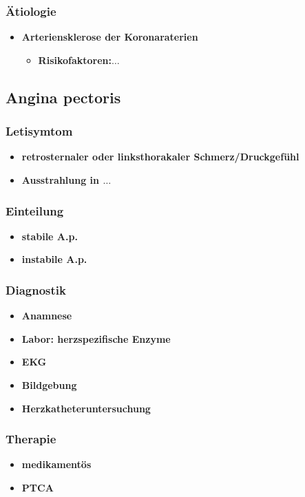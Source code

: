 		\subsubsection*{Ätiologie}
			\begin{itemize}
				\item \textbf{Arteriensklerose der Koronaraterien}
					\begin{itemize}
						\item \textbf{Risikofaktoren:$\dots$}
					\end{itemize}
			\end{itemize}
	\subsection*{Angina pectoris}
		\subsubsection*{Letisymtom}
			\begin{itemize}
				\item \textbf{retrosternaler oder linksthorakaler Schmerz/Druckgefühl}
				\item \textbf{Ausstrahlung in $\dots$}
			\end{itemize}
		\subsubsection*{Einteilung}
			\begin{itemize}
				\item \textbf{stabile A.p.}
				\item \textbf{instabile A.p.}
			\end{itemize}
		\subsubsection*{Diagnostik}
			\begin{itemize}
				\item \textbf{Anamnese}
				\item \textbf{Labor: herzspezifische Enzyme}
				\item \textbf{EKG}
				\item \textbf{Bildgebung}
				\item \textbf{Herzkatheteruntersuchung}
			\end{itemize}
		\subsubsection*{Therapie}
			\begin{itemize}
				\item \textbf{medikamentös}
				\item \textbf{PTCA}
			\end{itemize}
